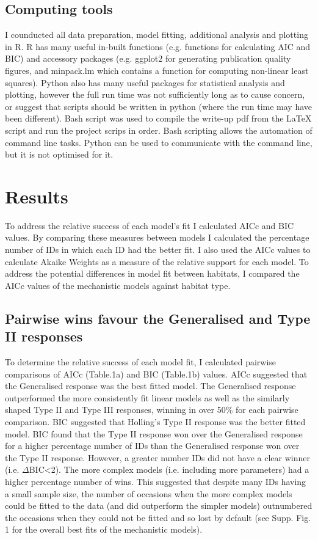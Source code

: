 \documentclass[11pt]{article}
\begin{document}
        \subsection{Computing tools}
            I counducted all data preparation, model fitting, additional analysis and plotting in R. R has many useful in-built functions (e.g. functions for calculating AIC and BIC) and accessory packages (e.g. ggplot2 for generating publication quality figures, and minpack.lm which contains a function for computing non-linear least squares). Python also has many useful packages for statistical analysis and plotting, however the full run time was not sufficiently long as to cause concern, or suggest that scripts should be written in python (where the run time may have been different). Bash script was used to compile the write-up pdf from the LaTeX script and run the project scrips in order. Bash scripting allows the automation of command line tasks. Python can be used to communicate with the command line, but it is not optimised for it.
        
    \section{Results} 

        To address the relative success of each model's fit I calculated AICc and BIC values. By comparing these measures between models I calculated the percentage number of IDs in which each ID had the better fit. I also used the AICc values to calculate Akaike Weights as a measure of the relative support for each model. To address the potential differences in model fit between habitats, I compared the AICc values of the mechanistic models against habitat type.

        \subsection{Pairwise wins favour the Generalised and Type II responses}
            To determine the relative success of each model fit, I calculated pairwise comparisons of AICc (Table.1a) and BIC (Table.1b) values. AICc suggested that the Generalised response was the best fitted model. The Generalised response outperformed the more consistently fit linear models as well as the similarly shaped Type II and Type III responses, winning in over 50\% for each pairwise comparison. BIC suggested that Holling's Type II response was the better fitted model. BIC found that the Type II response won over the Generalised response for a higher percentage number of IDs than the Generalised response won over the Type II response. However, a greater number IDs did not have a clear winner (i.e. $\Delta$BIC\textless2). The more complex models (i.e. including more parameters) had a higher percentage number of wins. This suggested that despite many IDs having a small sample size, the number of occasions when the more complex models could be fitted to the data (and did outperform the simpler models) outnumbered the occasions when they could not be fitted and so lost by default (see Supp. Fig. 1 for the overall best fits of the mechanistic models).
            
\end{document}
